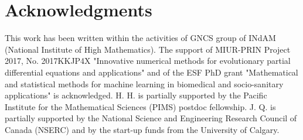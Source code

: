 \documentclass{ims9x6}
\begin{document}
 \section*{Acknowledgments}
This work has been written within the activities of GNCS group of INdAM (National Institute of High Mathematics). The support of MIUR-PRIN Project 2017, No. 2017KKJP4X "Innovative numerical methods for evolutionary partial differential equations and applications" and of the ESF PhD grant "Mathematical and statistical methods for machine learning in biomedical and socio-sanitary applications" is acknowledged. H. H. is partially supported by the Pacific Institute for the Mathematical Sciences (PIMS) postdoc fellowship. J. Q. is partially supported  by the National Science and Engineering Research Council of Canada (NSERC) and by the start-up funds from the University of Calgary.

\end{document}
